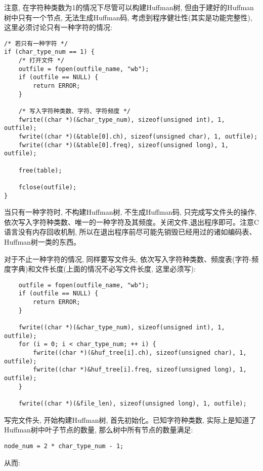 \documentclass[a4paper]{ctexart}
\begin{document}
注意, 在字符种类数为1的情况下尽管可以构建Huffman树, 但由于建好的Huffman树中只有一个节点, 无法生成Huffman码, 考虑到程序健壮性(其实是功能完整性), 这里必须讨论只有一种字符的情况:

{\setmainfont{Courier New Bold}              
\begin{lstlisting}
/* 若只有一种字符 */
if (char_type_num == 1) {
    /* 打开文件 */
    outfile = fopen(outfile_name, "wb");
    if (outfile == NULL) {
        return ERROR;
    }

    /* 写入字符种类数、字符、字符频度 */
    fwrite((char *)(&char_type_num), sizeof(unsigned int), 1, outfile);
    fwrite((char *)(&table[0].ch), sizeof(unsigned char), 1, outfile);
    fwrite((char *)(&table[0].freq), sizeof(unsigned long), 1, outfile);

    free(table);

    fclose(outfile);
}
\end{lstlisting}}

当只有一种字符时, 不构建Huffman树, 不生成Huffman码, 只完成写文件头的操作, 依次写入字符种类数、唯一的一种字符及其频度。关闭文件,退出程序即可。注意C语言没有内存回收机制, 所以在退出程序前尽可能先销毁已经用过的诸如编码表、Huffman树一类的东西。

对于不止一种字符的情况, 同样要写文件头, 依次写入字符种类数、频度表(字符-频度字典)和文件长度(上面的情况不必写文件长度, 这里必须写):

{\setmainfont{Courier New Bold}              
\begin{lstlisting}
    outfile = fopen(outfile_name, "wb");
    if (outfile == NULL) {
        return ERROR;
    }

    fwrite((char *)(&char_type_num), sizeof(unsigned int), 1, outfile);
    for (i = 0; i < char_type_num; ++ i) {
        fwrite((char *)(&huf_tree[i].ch), sizeof(unsigned char), 1, outfile);
        fwrite((char *)&huf_tree[i].freq, sizeof(unsigned long), 1, outfile);
    }

    fwrite((char *)(&file_len), sizeof(unsigned long), 1, outfile);
\end{lstlisting}}

写完文件头, 开始构建Huffman树, 首先初始化。已知字符种类数, 实际上是知道了Huffman树中叶子节点的数量, 那么树中所有节点的数量满足:

{\setmainfont{Courier New Bold}              
\begin{lstlisting}
node_num = 2 * char_type_num - 1;
\end{lstlisting}}

从而:
\end{document}
